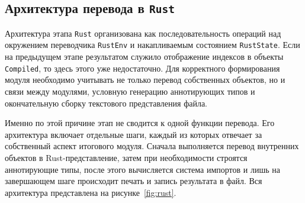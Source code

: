 \documentclass[a4paper,12pt]{article}
\begin{document}
\subsection{Архитектура перевода в \texttt{Rust}}

Архитектура этапа \texttt{Rust} организована как последовательность операций над
окружением переводчика \texttt{RustEnv} и накапливаемым состоянием \texttt{RustState}.
Если на предыдущем этапе результатом служило отображение индексов в объекты
\texttt{Compiled}, то здесь этого уже недостаточно. Для корректного формирования модуля
необходимо учитывать не только перевод собственных объектов, но и связи между модулями,
условную генерацию аннотирующих типов и окончательную сборку текстового представления
файла.

Именно по этой причине этап не сводится к одной функции перевода. Его архитектура
включает отдельные шаги, каждый из которых отвечает за собственный аспект итогового
модуля. Сначала выполняется перевод внутренних объектов в Rust-представление, затем при
необходимости строятся аннотирующие типы, после этого вычисляется система импортов и
лишь на завершающем шаге происходит печать и запись результата в файл. Вся архитектура
представлена на рисунке~\ref{fig:rust}.
\end{document}
